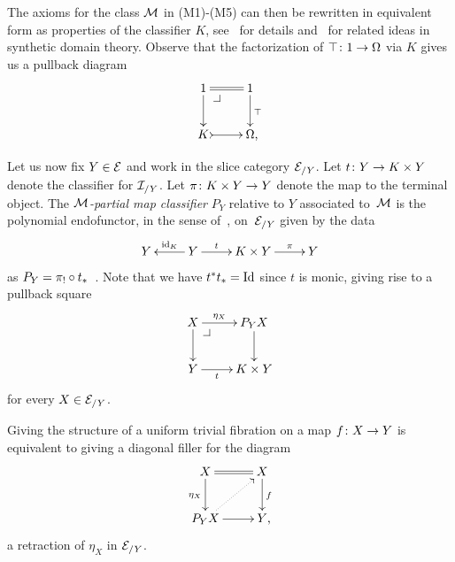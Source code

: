 \documentclass[reqno,10pt,a4paper,oneside,draft]{amsart}
\begin{document}
{{The axioms for the class $\cal{M}$ in (M1)-(M5) can then be rewritten in equivalent form as properties of the classifier $K$, see~\cite{PittsAM:aximct} for details and~\cite{HylandM:firssd,RosoliniG:phd} for related ideas in synthetic domain
theory. 
Observe that the factorization of $\top \co 1 \to \Omega$ via $K$ gives us a pullback diagram
\begin{equation} \label{partial-map-classifier:0}
\begin{gathered}
\xymatrix{
  1
  \ar@{=}[r]
  \ar[d]
  \pullback{dr}
&
  1
  \ar[d]^{\top}
\\
  K
  \ar@{>->}[r]
&
  \Omega \rlap{,}
}
\end{gathered}
\end{equation}

Let us now fix $Y \in \cal{E}$ and work in the slice category $\cal{E}_{/Y}$.
Let $t \co Y \to K \times Y$ denote the classifier for $\cal{I}_{/Y}$.
Let $\pi \co K \times Y \to Y$ denote the map to the terminal object.
The \emph{$\cal{M}$-partial map classifier} $P_Y$ relative to $Y$ associated to~$\cal{M}$ is the polynomial endofunctor, in the sense of~\cite{gambino-kock}, on~$\cal{E}_{/Y}$ given by the data
\[
\xymatrix{
  Y
&
  Y
  \ar[l]_-{\id_K}
  \ar[r]^-{t}
&
  K \times Y
  \ar[r]^-{\pi}
&
  Y
}
\]
as $P_Y = \pi_! \cc t_*$~\cite[A2.4]{johnstone:elephant}.
Note that we have $t^* t_* = \Id$ since $t$ is monic, giving rise to a pullback square
\begin{equation} \label{partial-map-classifier:1}
\begin{gathered}
\xymatrix{
  X
  \ar[r]^-{\eta_X}
  \ar[d]
  \pullback{dr}
&
  P_Y X
  \ar[d]
\\
  Y
  \ar[r]_-{t}
&
  K \times Y
}
\end{gathered}
\end{equation}
for every $X \in \cal{E}_{/Y}$.

\begin{theorem} \label{thm:part-map-character}
Giving the structure of a uniform trivial fibration on a map $f \co X \to Y$ is equivalent to giving a diagonal filler for the diagram
\begin{equation*}
\begin{gathered}
\xymatrix{
  X
  \ar@{=}[r]
  \ar[d]_{\eta_X}
&
  X
  \ar[d]^{f}
\\
  P_Y X
  \ar[r]
  \ar@{.>}[ur]
&
  Y
\rlap{,}}
\end{gathered}
\end{equation*}
\ie a retraction of $\eta_X$ in $\cal{E}_{/Y}$.
\end{theorem}

}}
\end{document}
